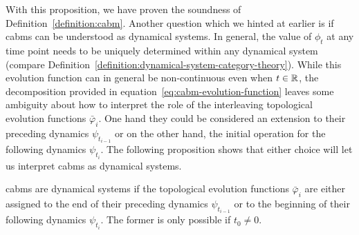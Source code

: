 With this proposition, we have proven the soundness of Definition~\ref{definition:cabm}.
Another question which we hinted at earlier is if \acp{cabm} can be understood as dynamical systems.
In general, the value of $\phi_t$ at any time point needs to be uniquely determined within any
dynamical system (compare Definition~\ref{definition:dynamical-system-category-theory}).
While this evolution function can in general be non-continuous even when $t\in\mathbb{R}$, the decomposition
provided in equation~\eqref{eq:cabm-evolution-function} leaves some ambiguity about how to interpret
the role of the interleaving topological evolution functions $\bar{\varphi}_i$.
One hand they could be considered an extension to their preceding dynamics $\psi_{t_{i-1}}$ or on
the other hand, the initial operation for the following dynamics $\psi_{t_i}$.
The following proposition shows that either choice will let us interpret \acp{cabm} as dynamical
systems.

\begin{proposition}
    \acp{cabm} are dynamical systems if the topological evolution functions $\bar{\varphi}_i$ are
    either assigned to the end of their preceding dynamics $\psi_{t_{i-1}}$ or to the beginning of
    their following dynamics $\psi_{t_i}$.
    The former is only possible if $t_0\neq0$.
    \label{proposition:cabm-are-dynamical-systems}
\end{proposition}

